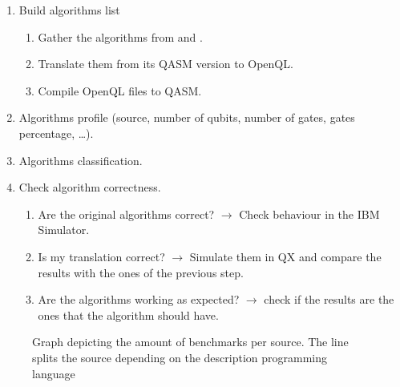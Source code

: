 \begin{enumerate}
\item Build algorithms list       
\begin{enumerate}
\item Gather the algorithms from \cite{zulehner17:effic_method_mappin_quant_circuit} and \cite{Lin_2014}.
\item Translate them from its QASM version to OpenQL.
\item Compile OpenQL files to QASM.
\end{enumerate}
\item Algorithms profile (source, number of qubits, number of gates, gates percentage, \ldots{}).
\item Algorithms classification.
\item Check algorithm correctness.
\begin{enumerate}
\item Are the original algorithms correct? \(\to\) Check behaviour in the IBM Simulator.
\item Is my translation correct? \(\to\) Simulate them in QX and compare the results with the ones of the previous step.
\item Are the algorithms working as expected? \(\to\) check if the results are the ones that the algorithm should have.
\end{enumerate}
\end{enumerate}

\begin{figure}
\centering
{}
\label{fig:benchmarks_graph}
\caption{Graph depicting the amount of benchmarks per source. The line splits the source depending on the description programming language}
\end{figure}

